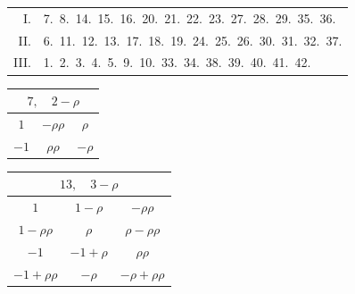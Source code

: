 \begin{center}\begin{tabular}{@{}rl@{}}
I. & 7.\ 8.\ 14.\ 15.\ 16.\ 20.\ 21.\ 22.\ 23.\ 27.\ 28.\ 29.\ 35.\ 36.\\
II. & 6.\ 11.\ 12.\ 13.\ 17.\ 18.\ 19.\ 24.\ 25.\ 26.\ 30.\ 31.\ 32.\ 37.\\
III. & 1.\ 2.\ 3.\ 4.\ 5.\ 9.\ 10.\ 33.\ 34.\ 38.\ 39.\ 40.\ 41.\ 42.\end{tabular}\end{center}
\begin{center}
\begin{tabular}[t]{c|c|c}
\multicolumn{3}{c}{$7,\quad2-\rho$}\\\hline
$1$&$-\rho\rho$&$\rho$\\
$-1$&$\rho\rho$&$-\rho$
\end{tabular}\qquad
\begin{tabular}[t]{c|c|c}
\multicolumn{3}{c}{$13,\quad3-\rho$}\\\hline
$1$&$1-\rho$&$-\rho\rho$\\
$1-\rho\rho$&$\rho$&$\rho-\rho\rho$\\
$-1$&$-1+\rho$&$\rho\rho$\\
$-1+\rho\rho$&$-\rho$&$-\rho+\rho\rho$
\end{tabular}
\end{center}\endgroup
